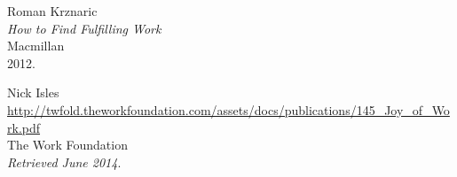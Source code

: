 \begin{thebibliography}{99}
  Roman Krznaric \\
  \emph{How to Find Fulfilling Work} \\
  Macmillan \\
  2012.

  Nick Isles \\
  \url{http://twfold.theworkfoundation.com/assets/docs/publications/145_Joy_of_Work.pdf} \\
  The Work Foundation \\
  \emph{Retrieved June 2014}.

\end{thebibliography}
